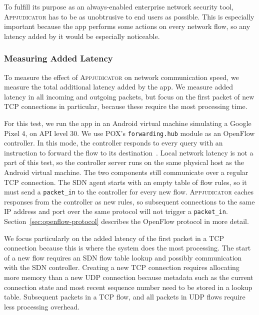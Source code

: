 To fulfill its purpose as an always-enabled enterprise network security tool,
\textsc{Appjudicator} has to be as unobtrusive to end users as possible. This is
especially important because the app performs some actions on every network
flow, so any latency added by it would be especially noticeable.

\subsubsection{Measuring Added Latency}
\label{sec:measuring-added-latency}

To measure the effect of \textsc{Appjudicator} on network communication speed,
we measure the total additional latency added by the app. We measure added
latency in all incoming and outgoing packets, but focus on the first packet of
new TCP connections in particular, because these require the most processing
time.

For this test, we run the app in an Android virtual machine simulating a Google
Pixel 4, on API level 30. We use POX's \texttt{forwarding.hub} module as an
OpenFlow controller. In this mode, the controller responds to every query with
an instruction to forward the flow to its destination~\cite{mccauley2015}. Local
network latency is not a part of this test, so the controller server runs on the
same physical host as the Android virtual machine. The two components still
communicate over a regular TCP connection. The SDN agent starts with an empty
table of flow rules, so it must send a \texttt{packet\_in} to the controller for
every new flow. \textsc{Appjudicator} caches responses from the controller as
new rules, so subsequent connections to the same IP address and port over the
same protocol will not trigger a \texttt{packet\_in}.
Section~\ref{sec:openflow-protocol} describes the OpenFlow protocol in more
detail.

We focus particularly on the added latency of the first packet in a TCP
connection because this is where the system does the most processing. The start
of a new flow requires an SDN flow table lookup and possibly communication with
the SDN controller. Creating a new TCP connection requires allocating more
memory than a new UDP connection because metadata such as the current connection
state and most recent sequence number need to be stored in a lookup table.
Subsequent packets in a TCP flow, and all packets in UDP flows require less
processing overhead.

